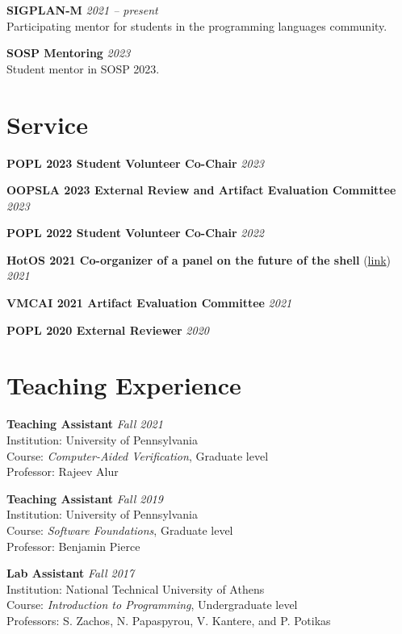 \documentclass[margin]{res}
\begin{document}
\begin{resume}
\textbf{SIGPLAN-M}  \hfill {\em 2021 -- present} \\
Participating mentor for students in the programming languages community.

\textbf{SOSP Mentoring}  \hfill {\em 2023} \\
Student mentor in SOSP 2023.

\section{Service}

\textbf{POPL 2023 Student Volunteer Co-Chair}  \hfill {\em 2023}

\textbf{OOPSLA 2023 External Review and Artifact Evaluation Committee}  \hfill {\em 2023}

\textbf{POPL 2022 Student Volunteer Co-Chair}  \hfill {\em 2022}

\textbf{HotOS 2021 Co-organizer of a panel on the future of the shell} (\href{https://fut-shell.github.io/}{link})  \hfill {\em 2021}

\textbf{VMCAI 2021 Artifact Evaluation Committee}  \hfill {\em 2021}

\textbf{POPL 2020 External Reviewer}  \hfill {\em 2020}

\section{Teaching Experience}

\textbf{Teaching Assistant}  \hfill {\em Fall 2021} \\
Institution: University of Pennsylvania \\
Course: \textit{Computer-Aided Verification}, Graduate level \\
Professor: Rajeev Alur

\textbf{Teaching Assistant}  \hfill {\em Fall 2019} \\
Institution: University of Pennsylvania \\
Course: \textit{Software Foundations}, Graduate level \\
Professor: Benjamin Pierce

\textbf{Lab Assistant}  \hfill {\em Fall 2017} \\
Institution: National Technical University of Athens \\
Course: \textit{Introduction to Programming}, Undergraduate level \\
Professors: S. Zachos, N. Papaspyrou, V. Kantere, and P. Potikas



\end{resume}
\end{document}
